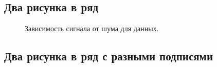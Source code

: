 \subsection{Два рисунка в ряд }

\begin{figure}[H]
\begin{minipage}[h]{0.49\linewidth}
\end{minipage}
\hfill
\begin{minipage}[h]{0.49\linewidth}
\end{minipage}
\caption{Зависимость сигнала от шума для данных.}
\label{ris:image1}
\end{figure}



\newpage
\subsection{Два рисунка в ряд с разными подписями}


